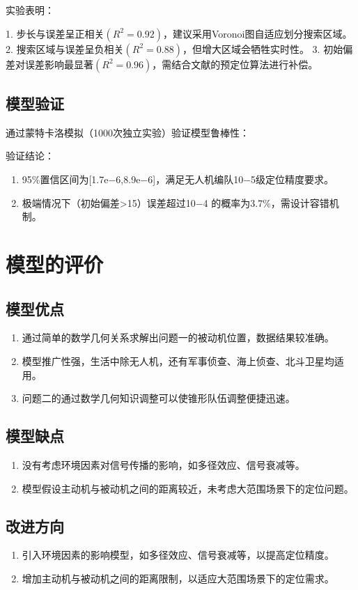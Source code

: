 \documentclass[withoutpreface,bwprint]{cumcmthesis} %
\begin{document}
实验表明：

1.
步长与误差呈正相关$(R^2=0.92)$，建议采用Voronoi图自适应划分搜索区域。
2.
搜索区域与误差呈负相关$(R^2=0.88)$，但增大区域会牺牲实时性。
3.
初始偏差对误差影响最显著$(R^2=0.96)$，需结合文献的预定位算法进行补偿。
\subsection{模型验证}
通过蒙特卡洛模拟（1000次独立实验）验证模型鲁棒性：

验证结论：
    \begin{enumerate}
        \item 95\%置信区间为[1.7e−6,8.9e−6]，满足无人机编队10−5级定位精度要求。
        \item 极端情况下（初始偏差>15）误差超过10−4 的概率为3.7\%，需设计容错机制。
    \end{enumerate}


\section{模型的评价}
\subsection{模型优点}
\begin{enumerate}
    \item 通过简单的数学几何关系求解出问题一的被动机位置，数据结果较准确。
    \item 模型推广性强，生活中除无人机，还有军事侦查、海上侦查、北斗卫星均适用。
    \item 问题二的通过数学几何知识调整可以使锥形队伍调整便捷迅速。
\end{enumerate}

\subsection{模型缺点}
\begin{enumerate}
    \item 没有考虑环境因素对信号传播的影响，如多径效应、信号衰减等。
    \item 模型假设主动机与被动机之间的距离较近，未考虑大范围场景下的定位问题。
\end{enumerate}

\subsection{改进方向}
\begin{enumerate}
    \item 引入环境因素的影响模型，如多径效应、信号衰减等，以提高定位精度。
    \item 增加主动机与被动机之间的距离限制，以适应大范围场景下的定位需求。
\end{enumerate}
\end{document}
